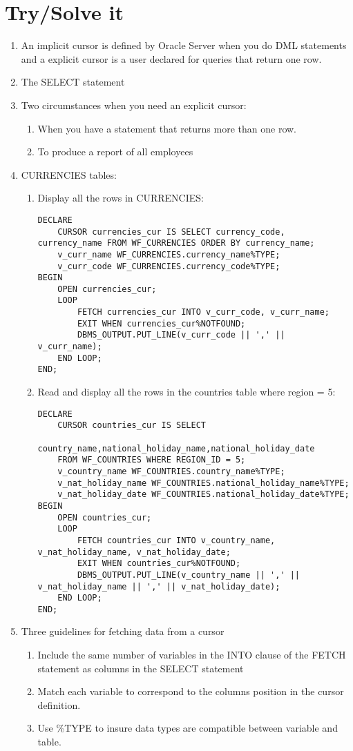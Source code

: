 \documentclass[11pt]{article}
\begin{document}
\section{Try/Solve it}
\label{sec:org7f0a3cd}
\begin{enumerate}
\item An implicit cursor is defined by Oracle Server when you do DML statements and
a explicit cursor is a user declared for queries that return one row.
\item The SELECT statement
\item Two circumstances when you need an explicit cursor:
\begin{enumerate}
\item When you have a statement that returns more than one row.
\item To produce a report of all employees
\end{enumerate}
\item CURRENCIES tables:
\begin{enumerate}
\item Display all the rows in CURRENCIES:
\begin{verbatim}
DECLARE
    CURSOR currencies_cur IS SELECT currency_code, currency_name FROM WF_CURRENCIES ORDER BY currency_name;
    v_curr_name WF_CURRENCIES.currency_name%TYPE;
    v_curr_code WF_CURRENCIES.currency_code%TYPE;
BEGIN
    OPEN currencies_cur;
    LOOP
        FETCH currencies_cur INTO v_curr_code, v_curr_name;
        EXIT WHEN currencies_cur%NOTFOUND;
        DBMS_OUTPUT.PUT_LINE(v_curr_code || ',' || v_curr_name);
    END LOOP;
END;
\end{verbatim}
\item Read and display all the rows in the countries table where region = 5:
\begin{verbatim}
DECLARE
    CURSOR countries_cur IS SELECT
        country_name,national_holiday_name,national_holiday_date
    FROM WF_COUNTRIES WHERE REGION_ID = 5;
    v_country_name WF_COUNTRIES.country_name%TYPE;
    v_nat_holiday_name WF_COUNTRIES.national_holiday_name%TYPE;
    v_nat_holiday_date WF_COUNTRIES.national_holiday_date%TYPE;
BEGIN
    OPEN countries_cur;
    LOOP
        FETCH countries_cur INTO v_country_name, v_nat_holiday_name, v_nat_holiday_date;
        EXIT WHEN countries_cur%NOTFOUND;
        DBMS_OUTPUT.PUT_LINE(v_country_name || ',' || v_nat_holiday_name || ',' || v_nat_holiday_date);
    END LOOP;
END;
\end{verbatim}
\end{enumerate}
\item Three guidelines for fetching data from a cursor
\begin{enumerate}
\item Include the same number of variables in the INTO clause of the FETCH statement as columns in the SELECT statement
\item Match each variable to correspond to the columns position in the cursor definition.
\item Use \%TYPE to insure data types are compatible between variable and table.
\end{enumerate}
\end{enumerate}
\end{document}
